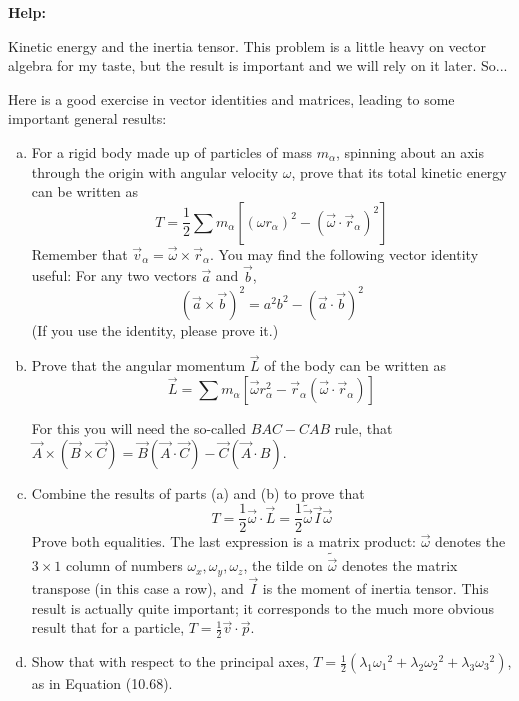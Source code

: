 \documentclass[11pt,letterpaper,boxed]{../hmcpsetrhino}
\newcommand{\half}{\frac{1}{2}}
\begin{document}
\textbf{Help:} \\
\begin{problem}[i]
Kinetic energy and the inertia tensor. This problem is a little heavy on vector algebra for my taste, but the result is important and we will rely on it later. So...

\begin{problem}[10.33]
Here is a good exercise in vector identities and matrices, leading to some important general results:
\begin{enumerate}[(a)]
\item For a rigid body made up of particles of mass $m_\alpha$, spinning about an axis through the origin with angular velocity $\omega$, prove that its total kinetic energy can be written as 
\[	T = \half \sum m_\alpha \left[ (\omega r_\alpha)^2 - (\vec \omega \cdot \vec r_\alpha)^2 \right]\]
Remember that $\vec v_\alpha = \vec \omega \times \vec r_\alpha$. You may find the following vector identity useful: For any two vectors $\vec a$ and $\vec b$,
\[	(\vec a \times \vec b)^2 = a^2 b^2 - (\vec a \cdot \vec b)^2 \]
(If you use the identity, please prove it.)

\item Prove that the angular momentum $\vec L$ of the body can be written as 
\[	\vec L = \sum m_\alpha \left[\vec \omega r_\alpha^2 - \vec r_\alpha (\vec \omega \cdot \vec r_\alpha)\right]\]

For this you will need the so-called $B A C - CAB$ rule, that $\vec A \times (\vec B \times \vec C) = \vec B(\vec A \cdot \vec C) - \vec C(\vec A \cdot B)$.

\item Combine the results of parts (a) and (b) to prove that 
\[	T = \half \vec \omega \cdot \vec L = \half \widetilde{\vec \omega} \vec I \vec \omega\]
Prove both equalities. The last expression is a matrix product: $\vec \omega$ denotes the $3 \times 1$ column of numbers $\omega_x, \omega_y, \omega_z$, the tilde on $\widetilde{ \vec \omega}$ denotes the matrix transpose (in this case a row), and $\vec I$ is the moment of inertia tensor. This result is actually quite important; it corresponds to the much more obvious result that for a particle, $T = \half \vec v \cdot \vec p$. 

\item Show that with respect to the principal axes, $T = \half (\lambda_1 {\omega_1}^2 + \lambda_2 {\omega_2}^2 + \lambda_3 {\omega_3}^2)$, as in Equation (10.68).
\end{enumerate}

\end{problem}
\end{problem}
\begin{solution}

\vfill
\end{solution}
\end{document}
